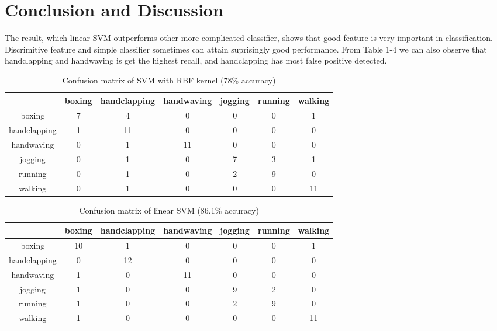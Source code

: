 \documentclass{article}
\begin{document}
\section{Conclusion and Discussion}
The result, which linear SVM outperforms other more complicated classifier, shows that good feature is very important in classification. Discrimitive feature and simple classifier sometimes can attain suprisingly good performance. From Table 1-4 we can also observe that handclapping and handwaving is get the highest recall, and handclapping has most false positive detected. 

\begin{table}[hb]
\caption{Confusion matrix of SVM with RBF kernel (78\% accuracy)}
\begin{center}
\begin{tabular}{c|cccccc}\hline
&boxing&handclapping &handwaving &jogging &running &walking\\ \hline
boxing&7& 4& 0& 0& 0& 1\\
handclapping&1& 11& 0& 0& 0& 0\\
handwaving&0& 1& 11&0 &0 &0 \\
jogging&0& 1& 0&7 &3 &1 \\
running&0& 1&0 &2 &9 &0 \\
walking&0&1 &0 &0 &0 &11 \\ \hline
\end{tabular}
\end{center}
\end{table} 

\begin{table}[bh]
\caption{Confusion matrix of linear SVM (86.1\% accuracy)}
\begin{center}
\begin{tabular}{c|cccccc}\hline
&boxing&handclapping &handwaving &jogging &running &walking\\ \hline
boxing&10& 1& 0& 0& 0& 1\\
handclapping&0& 12& 0& 0& 0& 0\\
handwaving&1& 0& 11&0 &0 &0 \\
jogging&1& 0& 0&9 &2 &0 \\
running&1& 0&0 &2 &9 &0 \\
walking&1&0 &0 &0 &0 &11 \\ \hline
\end{tabular}
\end{center}
\end{table} 
\end{document}
